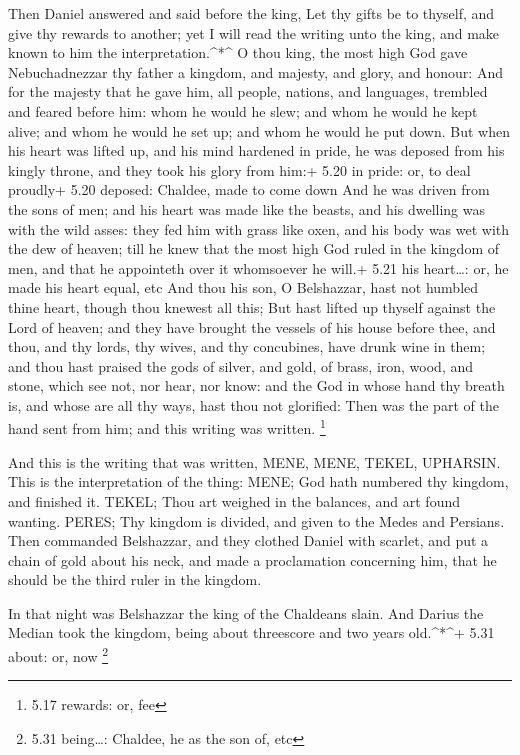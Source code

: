  Then Daniel answered and said before the king, Let thy
gifts be to thyself, and give thy rewards to another; yet I will read
the writing unto the king, and make known to him the
interpretation.\^{}*\^{}  O thou king, the most high God
gave Nebuchadnezzar thy father a kingdom, and majesty, and glory, and
honour:  And for the majesty that he gave him, all people,
nations, and languages, trembled and feared before him: whom he would he
slew; and whom he would he kept alive; and whom he would he set up; and
whom he would he put down.  But when his heart was lifted
up, and his mind hardened in pride, he was deposed from his kingly
throne, and they took his glory from him:+ 5.20 in pride: or, to deal
proudly+ 5.20 deposed: Chaldee, made to come down  And he
was driven from the sons of men; and his heart was made like the beasts,
and his dwelling was with the wild asses: they fed him with grass like
oxen, and his body was wet with the dew of heaven; till he knew that the
most high God ruled in the kingdom of men, and that he appointeth over
it whomsoever he will.+ 5.21 his heart\ldots: or, he made his heart
equal, etc  And thou his son, O Belshazzar, hast not
humbled thine heart, though thou knewest all this;  But
hast lifted up thyself against the Lord of heaven; and they have brought
the vessels of his house before thee, and thou, and thy lords, thy
wives, and thy concubines, have drunk wine in them; and thou hast
praised the gods of silver, and gold, of brass, iron, wood, and stone,
which see not, nor hear, nor know: and the God in whose hand thy breath
is, and whose are all thy ways, hast thou not glorified: 
Then was the part of the hand sent from him; and this writing was
written. \footnote{5.17 rewards: or, fee}

 And this is the writing that was written, MENE, MENE,
TEKEL, UPHARSIN.  This is the interpretation of the thing:
MENE; God hath numbered thy kingdom, and finished it. 
TEKEL; Thou art weighed in the balances, and art found wanting.
 PERES; Thy kingdom is divided, and given to the Medes and
Persians.  Then commanded Belshazzar, and they clothed
Daniel with scarlet, and put a chain of gold about his neck, and made a
proclamation concerning him, that he should be the third ruler in the
kingdom.

 In that night was Belshazzar the king of the Chaldeans
slain.  And Darius the Median took the kingdom, being about
threescore and two years old.\^{}*\^{}+ 5.31 about: or, now \footnote{5.31
  being\ldots: Chaldee, he as the son of, etc}

